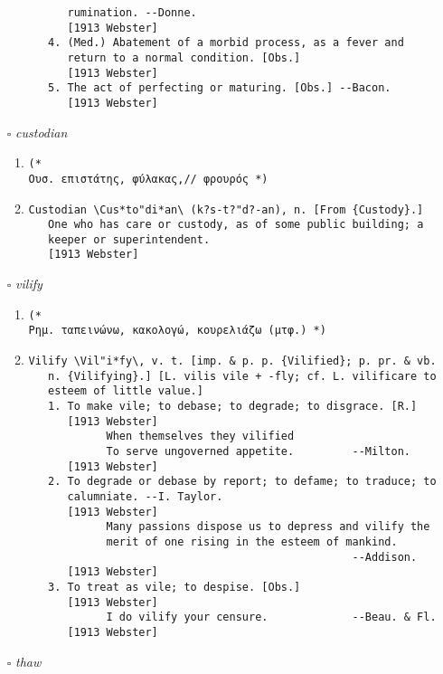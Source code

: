 \documentclass{article}
\begin{document}
\begin{itemize}
\begin{enumerate}
{\begin{lstlisting}
      rumination. --Donne.
      [1913 Webster]
   4. (Med.) Abatement of a morbid process, as a fever and
      return to a normal condition. [Obs.]
      [1913 Webster]
   5. The act of perfecting or maturing. [Obs.] --Bacon.
      [1913 Webster]
\end{lstlisting}}
\end{enumerate}
\item[$\square$] \emph{ custodian }
\begin{enumerate}
\item{
\begin{lstlisting}
(* 
Ουσ. επιστάτης, φύλακας,// φρουρός *)
\end{lstlisting}}
\item{
\begin{lstlisting}
Custodian \Cus*to"di*an\ (k?s-t?"d?-an), n. [From {Custody}.]
   One who has care or custody, as of some public building; a
   keeper or superintendent.
   [1913 Webster]
\end{lstlisting}}
\end{enumerate}
\item[$\square$] \emph{ vilify }
\begin{enumerate}
\item{
\begin{lstlisting}
(* 
Ρημ. ταπεινώνω, κακολογώ, κουρελιάζω (μτφ.) *)
\end{lstlisting}}
\item{
\begin{lstlisting}
Vilify \Vil"i*fy\, v. t. [imp. & p. p. {Vilified}; p. pr. & vb.
   n. {Vilifying}.] [L. vilis vile + -fly; cf. L. vilificare to
   esteem of little value.]
   1. To make vile; to debase; to degrade; to disgrace. [R.]
      [1913 Webster]
            When themselves they vilified
            To serve ungoverned appetite.         --Milton.
      [1913 Webster]
   2. To degrade or debase by report; to defame; to traduce; to
      calumniate. --I. Taylor.
      [1913 Webster]
            Many passions dispose us to depress and vilify the
            merit of one rising in the esteem of mankind.
                                                  --Addison.
      [1913 Webster]
   3. To treat as vile; to despise. [Obs.]
      [1913 Webster]
            I do vilify your censure.             --Beau. & Fl.
      [1913 Webster]
\end{lstlisting}}
\end{enumerate}
\item[$\square$] \emph{ thaw }
\begin{enumerate}

\end{enumerate}
\end{itemize}
\end{document}
